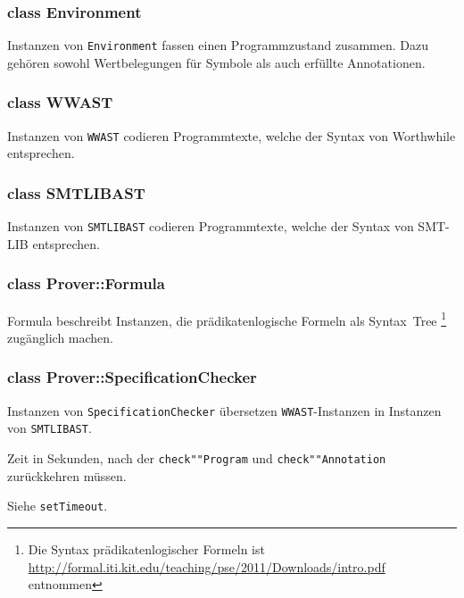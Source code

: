 \subsubsection{class Environment}%

Instanzen von \texttt{Environment} fassen einen Programmzustand
zusammen. Dazu gehören sowohl Wertbelegungen für Symbole als auch
erfüllte Annotationen.%

\subsubsection{class WWAST}%

Instanzen von \texttt{WWAST} codieren Programmtexte, welche der Syntax
von Worthwhile entsprechen.%

\subsubsection{class SMTLIBAST}%

Instanzen von \texttt{SMTLIBAST} codieren Programmtexte, welche der
Syntax von SMT-LIB entsprechen.%

\subsubsection{class Prover::Formula}%

Formula beschreibt Instanzen, die prädikatenlogische Formeln als
Syntax~Tree \footnote{Die Syntax prädikatenlogischer Formeln ist
\url{http://formal.iti.kit.edu/teaching/pse/2011/Downloads/intro.pdf}
entnommen} zugänglich machen.%

\subsubsection{class Prover::SpecificationChecker}%

Instanzen von \texttt{SpecificationChecker} übersetzen
\texttt{WWAST}-Instanzen in Instanzen von \texttt{SMTLIBAST}.%


\begin{description}%

    Zeit in Sekunden, nach der \texttt{check""Program} und
    \texttt{check""Annotation} zurückkehren müssen.%

    Siehe \texttt{setTimeout}.%


\end{description}%


